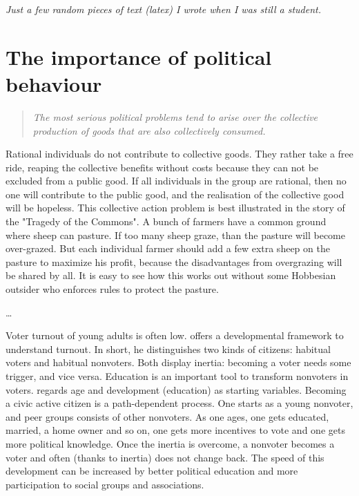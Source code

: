 \graphicspath{{_example/}}

\noindent
\textit{Just a few random pieces of text (latex) I wrote when I was still a student.}

\section{The importance of political behaviour}


\begin{quote}
\textit{The most serious political problems tend to arise over the collective production of goods that are also collectively consumed.} \citep[p. 34]{laver}
\end{quote}

\noindent
Rational individuals do not contribute to collective goods. They rather take a free ride, reaping the collective benefits without costs because they can not be excluded from a public good. If all individuals in the group are rational, then no one will contribute to the public good, and the realisation of the collective good will be hopeless. This collective action problem is best illustrated in the story of the "Tragedy of the Commons". A bunch of farmers have a common ground where sheep can pasture. If too many sheep graze, than the pasture will become over-grazed. But each individual farmer should add a few extra sheep on the pasture to maximize his profit, because the disadvantages from overgrazing will be shared by all. It is easy to see how this works out without some Hobbesian outsider who enforces rules to protect the pasture. \citep[p. 36, 48-50]{laver}

\ldots

Voter turnout of young adults is often low. \citet{plutzer} offers a developmental framework to understand turnout. In short, he distinguishes two kinds of citizens: habitual voters and habitual nonvoters. Both display inertia: becoming a voter needs some trigger, and vice versa. Education is an important tool to transform nonvoters in voters. \citeauthor{plutzer} regards age and development (education) as starting variables. Becoming a civic active citizen is a path-dependent process. One starts as a young nonvoter, and peer groups consists of other nonvoters. As one ages, one gets educated, married, a home owner and so on, one gets more incentives to vote and one gets more political knowledge. Once the inertia is overcome, a nonvoter becomes a voter and often (thanks to inertia) does not change back. The speed of this development can be increased by better political education and more participation to social groups and associations.

